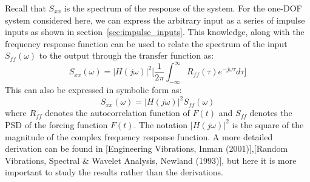 \documentclass[12pt,letter]{article}
\numberwithin{ex}{section} %
\numberwithin{re}{section} %
\numberwithin{equation}{section}	%
\begin{document}
Recall that $S_{xx}$ is the spectrum of the response of the system. For the one-DOF system considered here, we can express the arbitrary input as a series of impulse inputs as shown in section~\ref{sec:impulse_inputs}. This knowledge, along with the frequency response function can be used to relate the spectrum of the input $S_{ff}(\omega)$ to the output through the transfer function as:
\begin{equation}
S_{xx}(\omega) =  |H(j\omega)|^2\Bigg[\frac{1}{2 \pi } \int_{-\infty}^{\infty} R_{ff}(\tau) e^{-j \omega \tau}d  \tau  \Bigg] 
\end{equation}
This can also be expressed in symbolic form as:
\begin{equation}
S_{xx}(\omega) =  |H(j\omega)|^2 S_{ff}(\omega)
\end{equation}
where $R_{ff}$ denotes the autocorrelation function of $F(t)$ and $S_{ff}$ denotes the PSD of the forcing function $F(t)$. The notation $|H(j\omega)|^2$ is the square of the magnitude of the complex frequency response function. A more detailed derivation can be found in [Engineering Vibrations, Inman (2001)],[Random Vibrations, Spectral \& Wavelet Analysis, Newland (1993)], but here it is more important to study the results rather than the derivations. 
\end{document}
